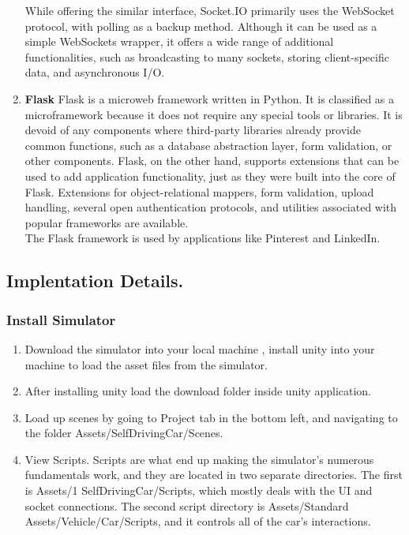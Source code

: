 \documentclass[ 12pt,a4paper,twocolumn,fleqn]{article}
\begin{document}
\begin{enumerate}
    While offering the similar interface, Socket.IO primarily uses the WebSocket protocol, with polling as a backup method. Although it can be used as a simple WebSockets wrapper, it offers a wide range of additional functionalities, such as broadcasting to many sockets, storing client-specific data, and asynchronous I/O.
    \item \textbf{Flask}
    Flask is a microweb framework written in Python. It is classified as a microframework because it does not require any special tools or libraries.  It is devoid of any components where third-party libraries already provide common functions, such as a database abstraction layer, form validation, or other components. Flask, on the other hand, supports extensions that can be used to add application functionality, just as they were built into the core of Flask. Extensions for object-relational mappers, form validation, upload handling, several open authentication protocols, and utilities associated with popular frameworks are available. \\
     The Flask framework is used by applications like Pinterest and LinkedIn.
\end{enumerate}

\subsection{ Implentation Details.}
\subsubsection{Install Simulator}
\begin{enumerate}
    \item Download the simulator into your local machine , install unity into your machine to load the asset files from the simulator.
    \item After installing unity load the download folder inside unity application. 
    \item Load up scenes by going to Project tab in the bottom left, and navigating to the folder Assets/SelfDrivingCar/Scenes.
    \item View Scripts. Scripts are what end up making the simulator's numerous fundamentals work, and they are located in two separate directories. The first is Assets/1 SelfDrivingCar/Scripts, which mostly deals with the UI and socket connections. The second script directory is Assets/Standard Assets/Vehicle/Car/Scripts, and it controls all of the car's interactions.
\end{enumerate}
\end{document}
